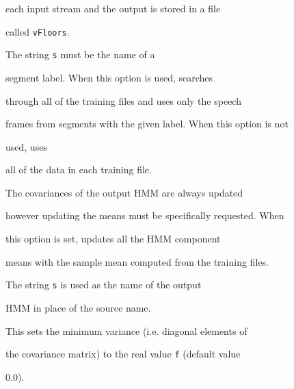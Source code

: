 \begin{optlist}
     each input stream and the output is stored in a file 


     called \texttt{vFloors}. 





   The string {\tt s} must be the name of a


      segment label.  When this option is used,  searches


      through all of the training files and uses only the speech


      frames from segments with the given label.  When this option is not 


      used,  uses


      all of the data in each training file.





   The covariances of the output HMM are always updated


    however updating the means must be specifically requested. When 


    this option is set,  updates all the HMM component 


    means with the sample mean computed from the training files. 





    The string {\tt s} is used as the name of the output


      HMM in place of the source name.





    This sets the minimum variance (i.e. diagonal elements of


      the covariance matrix) to the real value {\tt f} (default value


      0.0).





\stdoptB


\stdoptF


\stdoptG


\stdoptH


\stdoptI


\stdoptL


\stdoptM


\stdoptX





\end{optlist}


